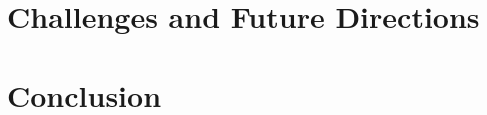 \documentclass[11pt,a4paper]{article}
\begin{document}
\section{Challenges and Future Directions}
\label{sec:challege_future}


% 

\section{Conclusion}
\label{sec:conclusion}








% 
\end{document}
